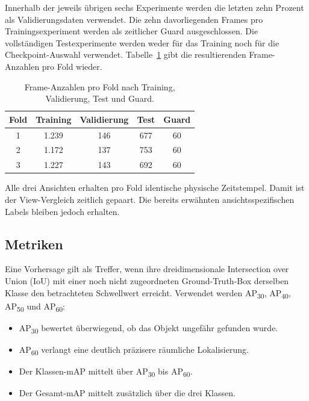Innerhalb der jeweils übrigen sechs Experimente werden die letzten zehn Prozent als Validierungsdaten verwendet. Die zehn davorliegenden Frames pro Trainingsexperiment werden als zeitlicher Guard ausgeschlossen. Die vollständigen Testexperimente werden weder für das Training noch für die Checkpoint-Auswahl verwendet. Tabelle~\ref{tab:cv-split-counts} gibt die resultierenden Frame-Anzahlen pro Fold wieder.

\begin{table}[H]
\centering
\begin{tabular}{ccccc}
\toprule
\textbf{Fold} & \textbf{Training} & \textbf{Validierung} & \textbf{Test} & \textbf{Guard} \\
\midrule
1 & 1.239 & 146 & 677 & 60 \\
2 & 1.172 & 137 & 753 & 60 \\
3 & 1.227 & 143 & 692 & 60 \\
\bottomrule
\end{tabular}
\caption{Frame-Anzahlen pro Fold nach Training, Validierung, Test und Guard.}
\label{tab:cv-split-counts}
\end{table}

Alle drei Ansichten erhalten pro Fold identische physische Zeitstempel. Damit ist der View-Vergleich zeitlich gepaart. Die bereits erwähnten ansichtsspezifischen Labels bleiben jedoch erhalten.

\subsection{Metriken}

Eine Vorhersage gilt als Treffer, wenn ihre dreidimensionale Intersection over Union (IoU) mit einer noch nicht zugeordneten Ground-Truth-Box derselben Klasse den betrachteten Schwellwert erreicht. Verwendet werden AP\textsubscript{30}, AP\textsubscript{40}, AP\textsubscript{50} und AP\textsubscript{60}:

\begin{itemize}
    \item AP\textsubscript{30} bewertet überwiegend, ob das Objekt ungefähr gefunden wurde.
    \item AP\textsubscript{60} verlangt eine deutlich präzisere räumliche Lokalisierung.
    \item Der Klassen-mAP mittelt über AP\textsubscript{30} bis AP\textsubscript{60}.
    \item Der Gesamt-mAP mittelt zusätzlich über die drei Klassen.
\end{itemize}

